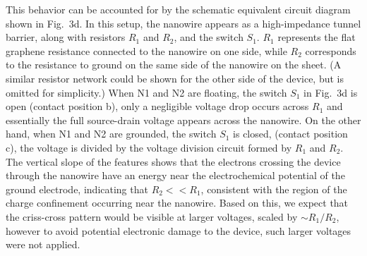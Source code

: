 \documentclass[journal=jacsat,manuscript=article]{achemso}
\begin{document}
This behavior can be accounted for by the schematic equivalent circuit diagram shown in Fig.~3d. In this setup, the nanowire appears as a high-impedance tunnel barrier, along with resistors $R_1$ and $R_2$, and the switch $S_1$. $R_1$ represents the flat graphene resistance connected to the nanowire on one side, while $R_2$ corresponds to the resistance to ground on the same side of the nanowire on the sheet. (A similar resistor network could be shown for the other side of the device, but is omitted for simplicity.) When N1 and N2 are floating, the switch $S_1$ in Fig.~3d is open (contact position b), only a negligible voltage drop occurs across $R_1$ and essentially the full source-drain voltage appears across the nanowire. On the other hand, when N1 and N2 are grounded, the switch $S_1$ is closed, (contact position c), the voltage is divided by the voltage division circuit formed by $R_1$ and $R_2$.  The vertical slope of the features shows that the electrons crossing the device through the nanowire have an energy near the electrochemical potential of the ground electrode, indicating that $R_2<<R_1$,  consistent with the region of the charge confinement occurring near the nanowire. Based on this, we expect that the criss-cross pattern would be visible at larger voltages, scaled by $\sim R_1/R_2$, however to avoid potential electronic damage to the device, such larger voltages were not applied. 
\end{document}
